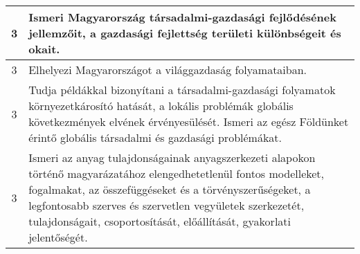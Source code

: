 \begin{longtable}{c | p{12cm} }
                                          3 &  Ismeri Magyarország társadalmi-gazdasági fejlődésének jellemzőit, a gazdasági fejlettség területi különbségeit és okait. \\ \hline
                                          3 &  Elhelyezi Magyarországot a világgazdaság folyamataiban. \\ \hline
                                          3 &  Tudja példákkal bizonyítani a társadalmi-gazdasági folyamatok környezetkárosító hatását, a lokális problémák globális következmények elvének érvényesülését. Ismeri az egész Földünket érintő globális társadalmi és gazdasági problémákat. \\ \hline
                                          3 &  Ismeri az anyag tulajdonságainak anyagszerkezeti alapokon történő magyarázatához elengedhetetlenül fontos modelleket, fogalmakat, az összefüggéseket és a törvényszerűségeket, a legfontosabb szerves és szervetlen vegyületek szerkezetét, tulajdonságait, csoportosítását, előállítását, gyakorlati jelentőségét. \\ \hline
                                      

\end{longtable}
